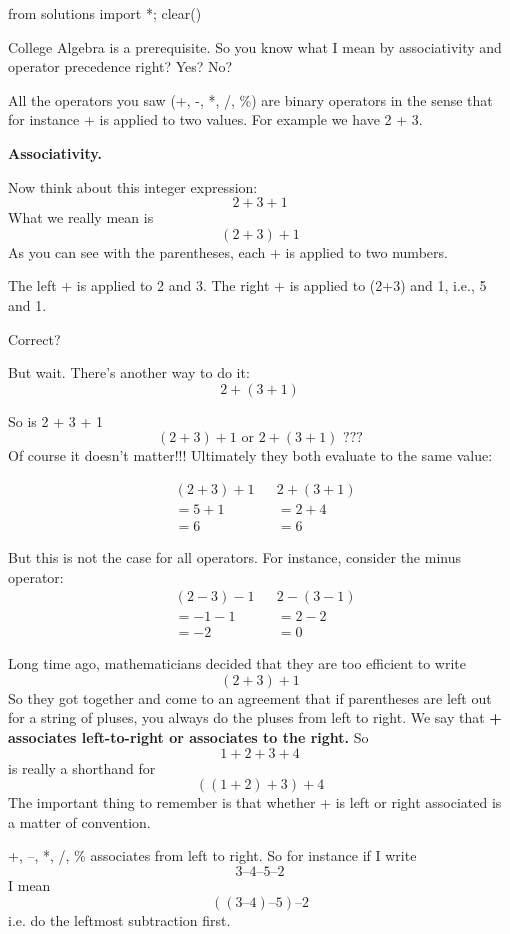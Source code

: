\begin{python0}
from solutions import *; clear()
\end{python0}



College Algebra is a prerequisite. So you know what I mean by
associativity and operator precedence right? Yes? No?


All the operators you saw (+, -, *, /, \%) are binary operators in the sense
that for instance + is applied to two values. For example we have 2 + 3.


\textbf{Associativity.}

Now think about this integer expression:
\[2+3+1\]
What we really mean is
\[(2 + 3) + 1\]
As you can see with the parentheses, each + is applied to two numbers.
\begin{console}
\li The left + is applied to 2 and 3.
\li The right + is applied to (2+3) and 1, i.e., 5 and 1.
\end{console}
Correct?


But wait. There's another way to do it:
\[2 + (3 + 1)\]

So is 2 + 3 + 1
\[(2 + 3) + 1 \text{     or     } 2 + (3 + 1)\text{    ???}\]
Of course it doesn't matter!!! Ultimately they both evaluate to the same value:

\begin{align*}
&(2 + 3) + 1 & & 2 + (3 + 1)\\
&=5+1 & & =2+4\\
&=6 & & =6
\end{align*}

But this is not the case for all operators. For instance, consider the minus
operator:
\begin{align*}
&(2 - 3) - 1 & & 2 - (3 - 1)\\
&=-1 - 1 & & =2-2\\
&=-2 & & =0
\end{align*}

Long time ago, mathematicians decided that they are too efficient to write
\[(2 + 3) + 1\]
So they got together and come to an agreement that if parentheses are
left out for a string of pluses, you always do the pluses from left to right.
We say that \textbf{{+ associates left-to-right or associates to the right.}} So
\[1+2+3+4\]
is really a shorthand for
\[((1 + 2) + 3) + 4\]
The important thing to remember is that whether + is left or right
associated is a matter of convention.

+, –, *, /, \% associates from left to right. So for instance if I write
\[3–4–5–2\]
I mean
\[((3 – 4) – 5) – 2\]
i.e. do the leftmost subtraction first.


